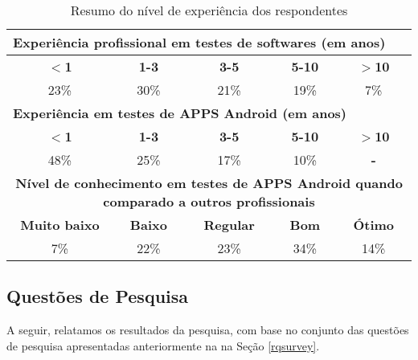 \begin{table*}[htbp]
\centering
  \def \arraystretch{1.1}
  \footnotesize
  \caption{Resumo do nível de experiência dos respondentes}
    \begin{tabular}{ccccc}
    \toprule
    \multicolumn{5}{l}{\textbf{Experiência profissional em testes de softwares (em anos)}} \\
    \midrule
    \textbf{$<$1} & \textbf{1-3} & \textbf{3-5} & \textbf{5-10} & \textbf{$>$10} \\
    \midrule
    23\%  & 30\%  & 21\%  & 19\%  & 7\% \\
    \midrule
    \multicolumn{5}{l}{\textbf{Experiência em testes de \ac{APPS} Android (em anos)}} \\
    \midrule
    \multicolumn{1}{c}{\textbf{$<$1}} & \textbf{1-3} & \textbf{3-5} & \textbf{5-10} & \textbf{$>$10} \\
    \midrule
    48\%  & 25\%  & 17\%  & 10\%  & {\textbf{-}} \\
    \midrule
    \multicolumn{5}{m{10cm}}{\textbf{Nível de conhecimento em testes de \ac{APPS} Android quando comparado a outros profissionais}} \\
    \midrule
    \textbf{Muito baixo} & \textbf{Baixo} & \textbf{Regular} & \textbf{Bom} & \textbf{Ótimo} \\
    \midrule
    7\%   & 22\%  & 23\%  & 34\%  & 14\% \\
    \bottomrule
    \end{tabular}%
  \label{tab:professionalinformation}%
\end{table*}

\subsection{Questões de Pesquisa}

A seguir, relatamos os resultados da pesquisa, com base no conjunto das questões de pesquisa apresentadas anteriormente na na Seção \ref{rqsurvey}.

